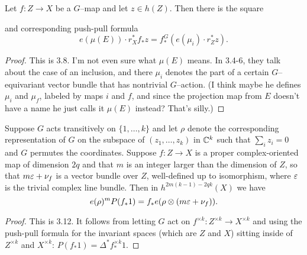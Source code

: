 \begin{theorem}
Let $f: Z \to X$ be a $G$--map and let $z \in h(Z)$.  Then there is the square
\begin{center}
\end{center}
and corresponding push-pull formula \[e(\mu(E)) \cdot r_X^* f_* z = f^G_*(e(\mu_i) \cdot r_Z^* z).\]
\end{theorem}
\begin{proof}
This is 3.8. I'm not even sure what $\mu(E)$ means. In 3.4-6, they talk about the case of an inclusion, and there $\mu_i$ denotes the part of a certain $G$--equivariant vector bundle that has nontrivial $G$--action.  (I think maybe he defines $\mu_i$ and $\mu_f$, labeled by maps $i$ and $f$, and since the projection map from $E$ doesn't have a name he just calls it $\mu(E)$ instead?  That's silly.)
\end{proof}

\begin{theorem}
Suppose $G$ acts transitively on $\{1, \ldots, k\}$ and let $\rho$ denote the corresponding representation of $G$ on the subspace of $(z_1, \ldots, z_k)$ in $\mathbb{C}^k$ such that $\sum_i z_i = 0$ and $G$ permutes the coordinates.  Suppose $f: Z \to X$ is a proper complex-oriented map of dimension $2q$ and that $m$ is an integer larger than the dimension of $Z$, so that $m \varepsilon + \nu_f$ is a vector bundle over $Z$, well-defined up to isomorphism, where $\varepsilon$ is the trivial complex line bundle.  Then in $h^{2m(k-1) - 2qk}(X)$ we have \[e(\rho)^m P(f_* 1) = f_* e(\rho \otimes (m \varepsilon + \nu_f)).\]
\end{theorem}
\begin{proof}
This is 3.12.  It follows from letting $G$ act on $f^{\times k}: Z^{\times k} \to X^{\times k}$ and using the push-pull formula for the invariant spaces (which are $Z$ and $X$) sitting inside of $Z^{\times k}$ and $X^{\times k}$: $P(f_* 1) = \Delta^* f^{\times k}_* 1$.
\end{proof}

